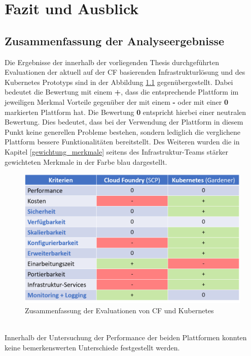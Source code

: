 \chapter{Fazit und Ausblick}
\section{Zusammenfassung der Analyseergebnisse}
\label{fazit}
Die Ergebnisse der innerhalb der vorliegenden Thesis durchgeführten Evaluationen der aktuell auf der \ac{CF} basierenden Infrastrukturlösung und des Kubernetes Prototyps sind in der Abbildung \ref{fazit_tabelle} gegenübergestellt.
Dabei bedeutet die Bewertung mit einem \textbf{+}, dass die entsprechende Plattform im jeweiligen Merkmal Vorteile gegenüber der mit einem \textbf{-} oder mit einer \textbf{0} markierten Plattform hat. Die Bewertung \textbf{0} entspricht hierbei einer neutralen Bewertung. Dies bedeutet, dass bei der Verwendung der Plattform in diesem Punkt keine generellen Probleme bestehen, sondern lediglich die verglichene Plattform bessere Funktionalitäten bereitstellt. Des Weiteren wurden die in Kapitel \ref{gewichtung_merkmale} seitens des Infrastruktur-Teams stärker gewichteten Merkmale in der Farbe blau dargestellt.
\\
\begin{figure}[h]
	\begin{center}
		\includegraphics[width=16cm]{img/fazit_tabelle.PNG}
		\caption[Zusammenfassung der Evaluationen von \acl{CF} und Kubernetes]{Zusammenfassung der Evaluationen von \acl{CF} und Kubernetes}
		\label{fazit_tabelle}
	\end{center}
\end{figure}
\\
Innerhalb der Untersuchung der Performance der beiden Plattformen konnten keine bemerkenswerten Unterschiede festgestellt werden.\\
